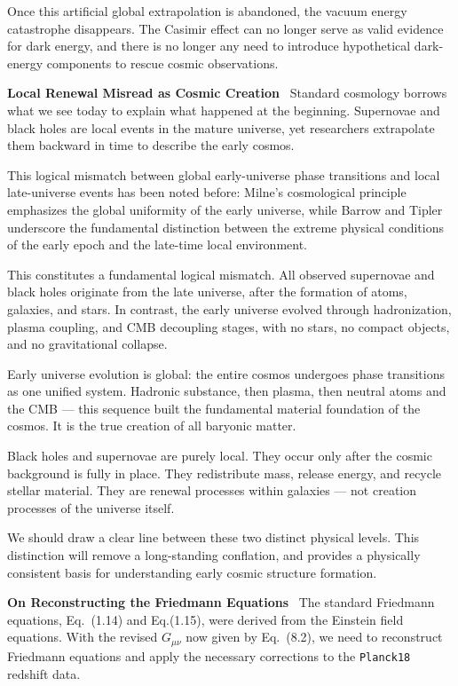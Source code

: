 \documentclass[12pt,leqno]{article}
\begin{document}
{	\medskip
	Once this artificial global extrapolation is abandoned, the vacuum energy catastrophe disappears. The Casimir effect can no longer serve as valid evidence for dark energy, and there is no longer any need to introduce hypothetical dark-energy components to rescue cosmic observations.


	
	\medskip
	\bigskip
	\textbf{Local Renewal Misread as Cosmic Creation}\,\,\,
	Standard cosmology borrows what we see today to explain what happened at the beginning. Supernovae and black holes are local events in the mature universe, yet researchers extrapolate them backward in time to describe the early cosmos. 
	
	\medskip
	This logical mismatch between global early-universe phase transitions and local late-universe events has been noted before: Milne's cosmological principle~\cite{Milne:1933} emphasizes the global uniformity of the early universe, while Barrow and Tipler~\cite{Barrow:1986} underscore the fundamental distinction between the extreme physical conditions of the early epoch and the late-time local environment.
	
	\medskip
	This constitutes a fundamental logical mismatch. All observed supernovae and black holes originate from the late universe, after the formation of atoms, galaxies, and stars. In contrast, the early universe evolved through hadronization, plasma coupling, and CMB decoupling stages, with no stars, no compact objects, and no gravitational collapse.
	
	\medskip
	Early universe evolution is global: the entire cosmos undergoes phase transitions as one unified system. Hadronic substance, then plasma, then neutral atoms and the CMB — this sequence built the fundamental material foundation of the cosmos. It is the true creation of all baryonic matter.
	
	\medskip
	Black holes and supernovae are purely local. They occur only after the cosmic background is fully in place. They redistribute mass, release energy, and recycle stellar material. They are renewal processes within galaxies — not creation processes of the universe itself.
	
	\medskip
	We should draw a clear line between these two distinct physical levels. This distinction will remove a long-standing conflation, and provides a physically consistent basis for understanding early cosmic structure formation.
	
	
	
	
	\medskip
	\bigskip
	\textbf{On Reconstructing the Friedmann Equations}\,\,\,
	The standard Friedmann equations, Eq.~(1.14) and Eq.(1.15), were derived from the Einstein field equations. With the revised $G_{\mu\nu}$ now given by Eq.~(8.2), we need to reconstruct Friedmann equations and apply the necessary corrections to the \texttt{Planck18} redshift data.
	
}
\end{document}
